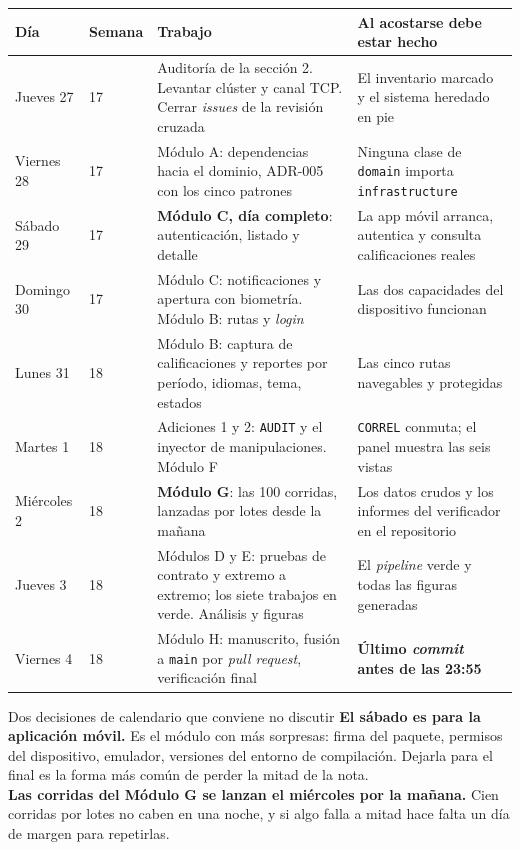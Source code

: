 \documentclass[11pt,a4paper]{article}
\begin{document}
\begin{center}
	\small
	\begin{longtable}{@{}p{2.6cm}p{1.5cm}p{5.2cm}p{5.0cm}@{}}
		\toprule
		\textbf{Día} & \textbf{Semana} & \textbf{Trabajo} & \textbf{Al acostarse debe estar hecho} \\
		\midrule
		\endhead
		Jueves 27 & 17 & Auditoría de la sección 2. Levantar clúster y canal TCP. Cerrar \emph{issues} de la revisión cruzada & El inventario marcado y el sistema heredado en pie \\
		\addlinespace
		Viernes 28 & 17 & Módulo A: dependencias hacia el dominio, ADR-005 con los cinco patrones & Ninguna clase de \texttt{domain} importa \texttt{infrastructure} \\
		\addlinespace
		Sábado 29 & 17 & \textbf{Módulo C, día completo}: autenticación, listado y detalle & La app móvil arranca, autentica y consulta calificaciones reales \\
		\addlinespace
		Domingo 30 & 17 & Módulo C: notificaciones y apertura con biometría. Módulo B: rutas y \emph{login} & Las dos capacidades del dispositivo funcionan \\
		\addlinespace
		Lunes 31 & 18 & Módulo B: captura de calificaciones y reportes por período, idiomas, tema, estados & Las cinco rutas navegables y protegidas \\
		\addlinespace
		Martes 1 & 18 & Adiciones 1 y 2: \texttt{AUDIT} y el inyector de manipulaciones. Módulo F & \texttt{CORREL} conmuta; el panel muestra las seis vistas \\
		\addlinespace
		Miércoles 2 & 18 & \textbf{Módulo G}: las 100 corridas, lanzadas por lotes desde la mañana & Los datos crudos y los informes del verificador en el repositorio \\
		\addlinespace
		Jueves 3 & 18 & Módulos D y E: pruebas de contrato y extremo a extremo; los siete trabajos en verde. Análisis y figuras & El \emph{pipeline} verde y todas las figuras generadas \\
		\addlinespace
		Viernes 4 & 18 & Módulo H: manuscrito, fusión a \texttt{main} por \emph{pull request}, verificación final & \textbf{Último \emph{commit} antes de las 23:55} \\
		\bottomrule
	\end{longtable}
\end{center}

\begin{avisoBox}{Dos decisiones de calendario que conviene no discutir}
	\textbf{El sábado es para la aplicación móvil.} Es el módulo con más sorpresas: firma del paquete, permisos del dispositivo, emulador, versiones del entorno de compilación. Dejarla para el final es la forma más común de perder la mitad de la nota.\\[5pt]
	\textbf{Las corridas del Módulo G se lanzan el miércoles por la mañana.} Cien corridas por lotes no caben en una noche, y si algo falla a mitad hace falta un día de margen para repetirlas.
\end{avisoBox}
\end{document}
